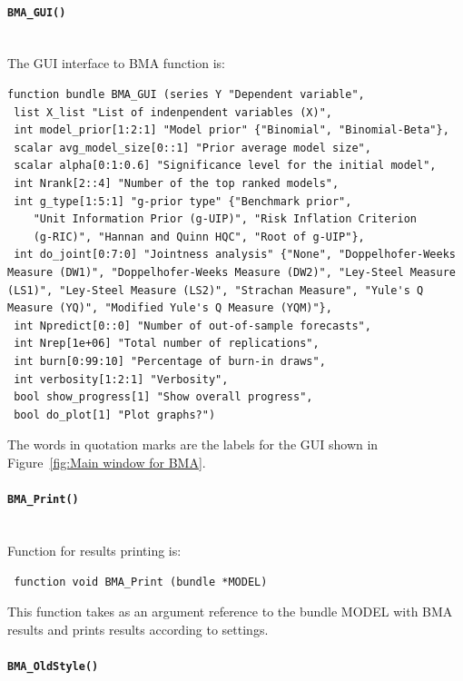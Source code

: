 \paragraph{\texttt{BMA\_GUI()}}\label{sec:BMA_GUI()}\mbox{}\\

\noindent The GUI interface to BMA function is:
\begin{lstlisting}
function bundle BMA_GUI (series Y "Dependent variable",
 list X_list "List of indenpendent variables (X)",
 int model_prior[1:2:1] "Model prior" {"Binomial", "Binomial-Beta"},
 scalar avg_model_size[0::1] "Prior average model size",
 scalar alpha[0:1:0.6] "Significance level for the initial model",
 int Nrank[2::4] "Number of the top ranked models",
 int g_type[1:5:1] "g-prior type" {"Benchmark prior",
	"Unit Information Prior (g-UIP)", "Risk Inflation Criterion
	(g-RIC)", "Hannan and Quinn HQC", "Root of g-UIP"},
 int do_joint[0:7:0] "Jointness analysis" {"None", "Doppelhofer-Weeks Measure (DW1)", "Doppelhofer-Weeks Measure (DW2)", "Ley-Steel Measure (LS1)", "Ley-Steel Measure (LS2)", "Strachan Measure", "Yule's Q Measure (YQ)", "Modified Yule's Q Measure (YQM)"},
 int Npredict[0::0] "Number of out-of-sample forecasts",
 int Nrep[1e+06] "Total number of replications",
 int burn[0:99:10] "Percentage of burn-in draws",
 int verbosity[1:2:1] "Verbosity",
 bool show_progress[1] "Show overall progress",
 bool do_plot[1] "Plot graphs?")
\end{lstlisting}

The words in quotation marks are the labels for the GUI shown in
Figure~\ref{fig:Main window for BMA}.

\paragraph{\texttt{BMA\_Print()}}\label{sec:BMA_Print()}\mbox{}\\

\noindent Function for results printing is: 
\begin{lstlisting}
 function void BMA_Print (bundle *MODEL)
\end{lstlisting}
This function takes as an argument reference to the bundle MODEL
with BMA results and prints results according to  settings.

\paragraph{\texttt{BMA\_OldStyle()}}\label{sec:BMA_OldStyle()}\mbox{}\\

